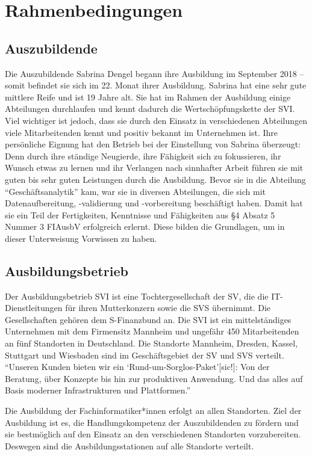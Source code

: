 \chapter{Rahmenbedingungen}

\section{Auszubildende}
Die Auszubildende Sabrina Dengel begann ihre Ausbildung im September 2018 -- somit befindet sie sich im 22. Monat ihrer Ausbildung. Sabrina hat eine sehr gute mittlere Reife und ist 19 Jahre alt. Sie hat im Rahmen der Ausbildung einige Abteilungen durchlaufen und kennt dadurch die Wertschöpfungskette der \ac{SVI}. Viel wichtiger ist jedoch, dass sie durch den Einsatz in verschiedenen Abteilungen viele Mitarbeitenden kennt und positiv bekannt im Unternehmen ist. Ihre persönliche Eignung hat den Betrieb bei der Einstellung von Sabrina überzeugt: Denn durch ihre ständige Neugierde, ihre Fähigkeit sich zu fokussieren, ihr Wunsch etwas zu lernen und ihr Verlangen nach sinnhafter Arbeit führen sie mit guten bis sehr guten Leistungen durch die Ausbildung. Bevor sie in die Abteilung \enquote{Geschäftsanalytik} kam, war sie in diversen Abteilungen, die sich mit Datenaufbereitung, -validierung und -vorbereitung beschäftigt haben. Damit hat sie ein Teil der Fertigkeiten, Kenntnisse und Fähigkeiten aus §4 Absatz 5 Nummer 3 \ac{FIAusbV} erfolgreich erlernt. Diese bilden die Grundlagen, um in dieser Unterweisung Vorwissen zu haben. 

\section{Ausbildungsbetrieb}
Der Ausbildungsbetrieb \ac{SVI} ist eine Tochtergesellschaft der \ac{SV}, die die IT-Dienstleitungen für ihren Mutterkonzern sowie die \ac{SVS} übernimmt. Die Gesellschaften gehören dem S-Finanzbund an. Die \ac{SVI} ist ein mittelständiges Unternehmen mit dem Firmensitz Mannheim und ungefähr 450 Mitarbeitenden\autocite[vgl.][]{sv_informatik_gmbg_uber_2020} an fünf Standorten in Deutschland. Die Standorte Mannheim, Dresden, Kassel, Stuttgart und Wiesbaden sind im Geschäftsgebiet der \ac{SV} und \ac{SVS} verteilt. \enquote{Unseren Kunden bieten wir ein \enquote{Rund-um-Sorglos-Paket}[sic!]: Von der Beratung, über Konzepte bis hin zur produktiven Anwendung. Und das alles auf Basis moderner Infrastrukturen und Plattformen.}\autocite{sv_informatik_gmbg_uber_2020}
\par
Die Ausbildung der Fachinformatiker*innen erfolgt an allen Standorten. Ziel der Ausbildung ist es, die Handlungskompetenz der Auszubildenden zu fördern und sie bestmöglich auf den Einsatz an den verschiedenen Standorten vorzubereiten. Deswegen sind die Ausbildungsstationen auf alle Standorte verteilt.

